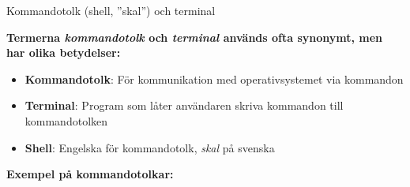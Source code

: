 



\begin{Slide}{Kommandotolk (shell, ''skal'') och terminal}

    \textbf{Termerna \emph{kommandotolk} och \emph{terminal} används ofta synonymt, men har olika betydelser:}

    \halfblankline
    \begin{itemize}
        \item \textbf{Kommandotolk}: {För kommunikation med operativsystemet via kommandon}
        \item \textbf{Terminal}: {Program som låter användaren skriva kommandon till kommandotolken}
        \item \textbf{Shell}: {Engelska för kommandotolk}, \textit{skal} på svenska
    \end{itemize}

    \blankline

    \noindent\textbf{Exempel på kommandotolkar:}
    \begin{itemize}
    \end{itemize}

\end{Slide}



